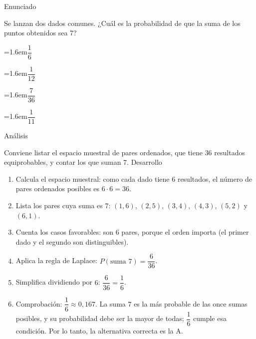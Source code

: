 \documentclass[10pt,a4paper,twocolumn]{article}
\newcommand{\alternativa}[2]{\par\noindent\hangindent=1.6em\hangafter=1\makebox[1.6em][l]{\tecla{#1}}#2\par}
\newcommand{\clave}[1]{\par\smallskip{\sffamily\footnotesize\color{esmeralda} Clave \teclaok{#1}}\par}
\begin{document}
\begin{ejemplo}
{\sffamily\footnotesize\color{zinc500} Enunciado}\par
Se lanzan dos dados comunes. ¿Cuál es la probabilidad de que la suma de los puntos obtenidos sea 7?
\alternativa{A}{$\dfrac{1}{6}$}
\alternativa{B}{$\dfrac{1}{12}$}
\alternativa{C}{$\dfrac{7}{36}$}
\alternativa{D}{$\dfrac{1}{11}$}
\clave{A}
{\sffamily\footnotesize\color{zinc500} Análisis}\par Conviene listar el espacio muestral de pares ordenados, que tiene $36$ resultados equiprobables, y contar los que suman $7$.
{\sffamily\footnotesize\color{zinc500} Desarrollo}
\begin{enumerate}
  \item Calcula el espacio muestral: como cada dado tiene $6$ resultados, el número de pares ordenados posibles es $6\cdot 6 = 36$.
  \item Lista los pares cuya suma es $7$: $(1,6)$, $(2,5)$, $(3,4)$, $(4,3)$, $(5,2)$ y $(6,1)$.
  \item Cuenta los casos favorables: son $6$ pares, porque el orden importa (el primer dado y el segundo son distinguibles).
  \item Aplica la regla de Laplace: $P(\text{suma } 7) = \dfrac{6}{36}$.
  \item Simplifica dividiendo por $6$: $\dfrac{6}{36} = \dfrac{1}{6}$.
  \item Comprobación: $\dfrac{1}{6}\approx 0{,}167$. La suma $7$ es la más probable de las once sumas posibles, y su probabilidad debe ser la mayor de todas; $\dfrac{1}{6}$ cumple esa condición. Por lo tanto, la alternativa correcta es la A.
\end{enumerate}
\end{ejemplo}
\end{document}
